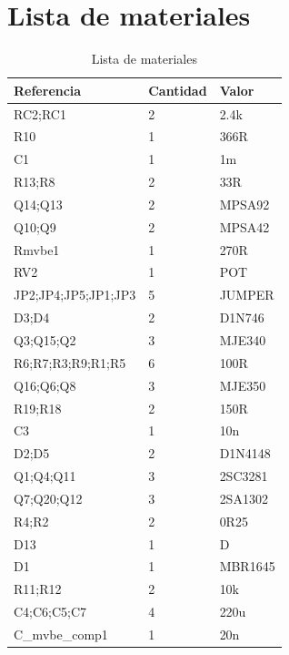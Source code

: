 \documentclass[a4paper,12pt,twoside]{article}
\begin{document}
\newpage

\section{Lista de materiales}

\begin{table}[h!]
\centering
\caption{Lista de materiales}
\label{label}
\begin{tabular}{@{}lll@{}}
\toprule
Referencia            & Cantidad & Valor     \\ \midrule
RC2;RC1               & 2        & 2.4k      \\
R10                   & 1        & 366R      \\
C1                    & 1        & 1m        \\
R13;R8                & 2        & 33R       \\
Q14;Q13               & 2        & MPSA92    \\
Q10;Q9                & 2        & MPSA42    \\
Rmvbe1                & 1        & 270R      \\
RV2                   & 1        & POT       \\
JP2;JP4;JP5;JP1;JP3   & 5        & JUMPER    \\
D3;D4                 & 2        & D1N746    \\
Q3;Q15;Q2             & 3        & MJE340    \\
R6;R7;R3;R9;R1;R5     & 6        & 100R      \\
Q16;Q6;Q8             & 3        & MJE350    \\
R19;R18               & 2        & 150R      \\
C3                    & 1        & 10n       \\
D2;D5                 & 2        & D1N4148   \\
Q1;Q4;Q11             & 3        & 2SC3281   \\
Q7;Q20;Q12            & 3        & 2SA1302   \\
R4;R2                 & 2        & 0R25      \\
D13                   & 1        & D         \\
D1                    & 1        & MBR1645   \\
R11;R12               & 2        & 10k       \\
C4;C6;C5;C7           & 4        & 220u      \\
C\_mvbe\_comp1        & 1        & 20n       \\

\end{tabular}
\end{table}
\end{document}

